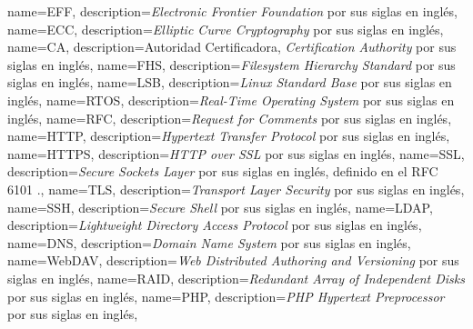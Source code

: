 {
  name=EFF,
  description={\emph{Electronic Frontier Foundation} por sus siglas en ingl\'{e}s},
}
{
  name=ECC,
  description={\emph{Elliptic Curve Cryptography} por sus siglas en ingl\'{e}s},
}
{
  name={CA},
  description={Autoridad Certificadora, \textit{Certification Authority} por sus siglas en ingl\'{e}s},
}
{
  name={FHS},
  description={\textit{Filesystem Hierarchy Standard} por sus siglas en ingl\'{e}s},
}
{
  name={LSB},
  description={\textit{Linux Standard Base} por sus siglas en ingl\'{e}s},
}
{
  name={RTOS},
  description={\textit{Real-Time Operating System} por sus siglas en ingl\'{e}s},
}
{
  name={RFC},
  description={\textit{Request for Comments} por sus siglas en ingl\'{e}s},
}
{
  name={HTTP},
  description={\textit{Hypertext Transfer Protocol} por sus siglas en ingl\'{e}s},
}
{
  name={HTTPS},
  description={\textit{HTTP over SSL} por sus siglas en ingl\'{e}s},
}
{
  name={SSL},
  description={\textit{Secure Sockets Layer} por sus siglas en ingl\'{e}s, definido en el \textsc{RFC} 6101 \cite{_rfc_????-4}.},
}
{
  name={TLS},
  description={\textit{Transport Layer Security} por sus siglas en ingl\'{e}s},
}
{
  name={SSH},
  description={\textit{Secure Shell} por sus siglas en ingl\'{e}s},
}
{
  name={LDAP},
  description={\textit{Lightweight Directory Access Protocol} por sus siglas en ingl\'{e}s},
}
{
  name={DNS},
  description={\textit{Domain Name System} por sus siglas en ingl\'{e}s},
}
{
  name={WebDAV},
  description={\textit{Web Distributed Authoring and Versioning} por sus siglas en ingl\'{e}s},
}
{
  name={RAID},
  description={\textit{Redundant Array of Independent Disks} por sus siglas en ingl\'{e}s},
}
{
  name={PHP},
  description={\textit{PHP Hypertext Preprocessor} por sus siglas en ingl\'{e}s},
}
